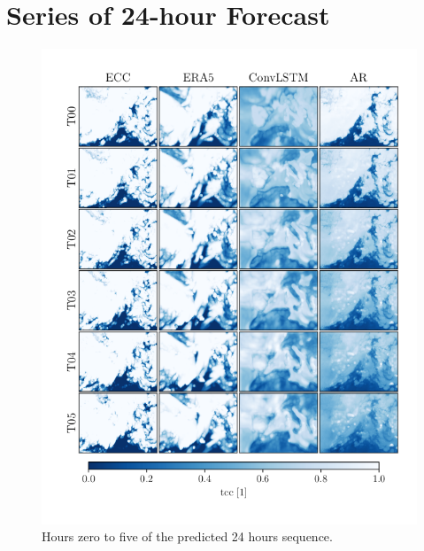 \cleardoublepage
\chapter{Series of 24-hour Forecast} \label{app:pred_sequence}
\begin{figure}[ht]
    \centering
    \includegraphics{python_figs/comparing_seq_part_1_of4_jan2.png}
    \caption{Hours zero to five of the predicted 24 hours sequence.}
    \label{fig:part1/4}
\end{figure}
